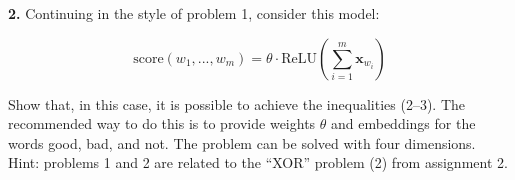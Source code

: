 {\bf 2.}
Continuing in the style of problem 1, consider this model:

\begin{equation}
    \textrm{score}(w_1, ..., w_m) = \mathbb{\theta} \cdot \textrm{ReLU} \left( \sum_{i=1}^{m} \mathbf{x}_{w_i} \right)
\end{equation}

Show that, in this case, it is possible to achieve the inequalities (2–3). 
The recommended way to do this is to provide weights $\mathbb{\theta}$ and embeddings for the words good, bad, and not. 
The problem can be solved with four dimensions. \\
Hint: problems 1 and 2 are related to the “XOR” problem (2) from assignment 2.

